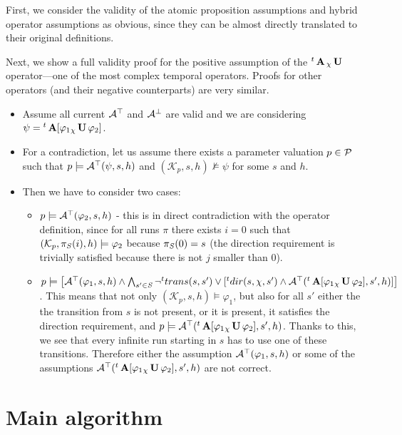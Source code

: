 First, we consider the validity of the atomic proposition assumptions and hybrid operator assumptions as obvious, since they can be almost directly translated to their original definitions. 

Next, we show a full validity proof for the positive assumption of the ${}^{t}\operatorname{\mathbf{A}}{}_{\chi}\operatorname{\mathbf{U}}$ operator—one of the most complex temporal operators. Proofs for other operators (and their negative counterparts) are very similar.

\begin{itemize}
	\item Assume all current $\mathcal{A}^\top$ and $\mathcal{A}^\bot$ are valid and we are considering $ \psi = {}^{t} \operatorname{\mathbf{A}}[ \varphi_1 {}_{\chi}\operatorname{\mathbf{U}} \varphi_2 ]$.
	\item For a contradiction, let us assume there exists a parameter valuation $p \in \mathcal{P}$ such that $p \models \mathcal{A}^\top(\psi, s, h)$ and $(\mathcal{K}_p, s, h) \not\models \psi$ for some $s$ and $h$.
	\item Then we have to consider two cases:
	\begin{itemize}
		\item $p \models \mathcal{A}^\top(\varphi_2, s, h)$ - this is in direct contradiction with the operator definition, since for all runs $\pi$ there exists $i = 0$ such that $(\mathcal{K}_p, \pi_{\mathit{S}}(i), h) \models \varphi_2$ because $\pi_{\mathit{S}}(0) = s$ (the direction requirement is trivially satisfied because there is not $j$ smaller than $0$).
		\item $p \models \big[ \mathcal{A}^\top(\varphi_1, s, h) \land \bigwedge_{s' \in \mathit{S}} \neg{}^{t}trans(s,s') \lor [{}^{t}dir(s, \chi, s') \land \mathcal{A}^\top({}^{t}\operatorname{\mathbf{A}}[ \varphi_1 {}_{\chi}\operatorname{\mathbf{U}} \varphi_2], s', h)] \big]$. This means that not only $(\mathcal{K}_p, s, h) \models \varphi_1$, but also for all $s'$ either the the transition from $s$ is not present, or it is present, it satisfies the direction requirement, and $p \models \mathcal{A}^\top({}^{t}\operatorname{\mathbf{A}}[ \varphi_1 {}_{\chi}\operatorname{\mathbf{U}} \varphi_2], s', h)$. Thanks to this, we see that every infinite run starting in $s$ has to use one of these transitions. Therefore either the assumption $\mathcal{A}^\top(\varphi_1, s, h)$ or some of the assumptions $\mathcal{A}^\top({}^{t}\operatorname{\mathbf{A}}[ \varphi_1 {}_{\chi}\operatorname{\mathbf{U}} \varphi_2], s', h)$ are not correct.
	\end{itemize}
\end{itemize}

\section{Main algorithm}

